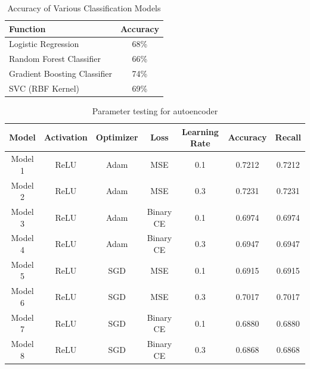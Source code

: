 \begin{table}[H]
    \centering
    \begin{tabular}{|l|c|}
        \hline
        \textbf{Function} & \textbf{Accuracy} \\
        \hline
        Logistic Regression & 68\% \\
        Random Forest Classifier & 66\% \\
        Gradient Boosting Classifier & 74\% \\
        SVC (RBF Kernel) & 69\% \\
        \hline
    \end{tabular}
    \caption{Accuracy of Various Classification Models}
    \label{tab:alg}
\end{table}


\begin{table}[H]
    \centering
    \begin{tabular}{|c|c|c|c|c|c|c|}
        \hline
        \rowcolor{lightgreen}
        \textbf{Model} & \textbf{Activation} & \textbf{Optimizer} & \textbf{Loss} & \textbf{Learning Rate} & \textbf{Accuracy} & \textbf{Recall} \\
        \hline
        Model 1 & ReLU & Adam & MSE & 0.1 & 0.7212 & 0.7212 \\
        \hline
        Model 2 & ReLU & Adam & MSE & 0.3 & 0.7231 & 0.7231 \\
        \hline
        Model 3 & ReLU & Adam & Binary CE & 0.1 & 0.6974 & 0.6974 \\
        \hline
        Model 4 & ReLU & Adam & Binary CE & 0.3 & 0.6947 & 0.6947 \\
        \hline
        Model 5 & ReLU & SGD & MSE & 0.1 & 0.6915 & 0.6915 \\
        \hline
        Model 6 & ReLU & SGD & MSE & 0.3 & 0.7017 & 0.7017 \\
        \hline
        Model 7 & ReLU & SGD & Binary CE & 0.1 & 0.6880 & 0.6880 \\
        \hline
        Model 8 & ReLU & SGD & Binary CE & 0.3 & 0.6868 & 0.6868 \\
        \hline
    \end{tabular}
    \caption{Parameter testing for autoencoder}
    \label{tab:op1}
\end{table}
